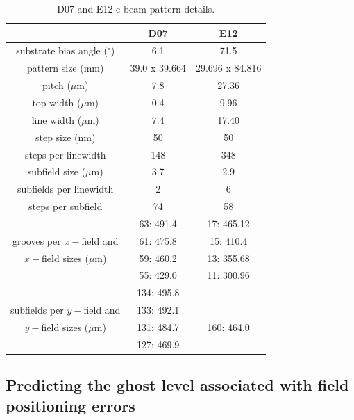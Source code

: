 \documentclass[]{spie}  %
\begin{document}
\begin{table}
	\caption{D07 and E12 e-beam pattern details. \label{tab:D07andE12}}
	\begin{tabular}{ccc}
	\toprule
	   &D07 & E12  \\
	\midrule
	substrate bias angle ($^\circ$) & 6.1 & 71.5 \\
	pattern size (mm) & 39.0 x 39.664 & 29.696 x 84.816 \\
	pitch ($\mu$m) & 7.8 & 27.36 \\
	top width ($\mu$m) & 0.4 & 9.96 \\
	line width ($\mu$m) & 7.4 & 17.40 \\
	step size (nm) & 50 & 50 \\
	steps per linewidth & 148 & 348 \\
	subfield size ($\mu$m) & 3.7 & 2.9 \\
	subfields per linewidth & 2 & 6 \\
	steps per subfield & 74 & 58 \\
	\cline{1-1}
	 			      & 63: 491.4  & 17: 465.12 \\
	grooves per $x-$field and & 61: 475.8 & 15: 410.4 \\
	$x-$field sizes ($\mu$m) & 59: 460.2 & 13: 355.68 \\
	 				        & 55: 429.0 & 11: 300.96 \\
	\cline{1-1}					        
	 			      & 134: 495.8  &   \\
	subfields per $y-$field and & 133: 492.1 &   \\
	$y-$field sizes ($\mu$m) & 131: 484.7 & 160: 464.0 \\
	 				        & 127: 469.9 &   \\	
	\cline{1-1}
	\bottomrule
	\end{tabular}
\end{table}	



\subsection{Predicting the ghost level associated with field positioning errors}
\label{sec:Ghosts}
\end{document}
